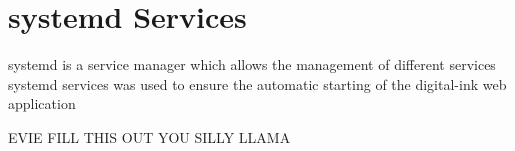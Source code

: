 \section{systemd Services}
systemd is a service manager which allows the management of different services
systemd services was used to ensure the automatic starting of the digital-ink web application



EVIE FILL THIS OUT YOU SILLY LLAMA